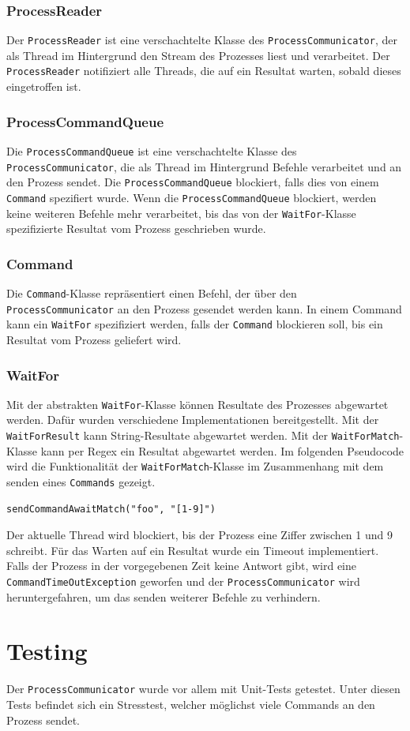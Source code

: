 \subsubsection{ProcessReader}

Der \verb!ProcessReader! ist eine verschachtelte Klasse des \verb!ProcessCommunicator!, der als Thread im Hintergrund den Stream des Prozesses liest und verarbeitet. Der \verb!ProcessReader! notifiziert alle Threads, die auf ein Resultat warten, sobald dieses eingetroffen ist.

\subsubsection{ProcessCommandQueue}

Die \verb!ProcessCommandQueue! ist eine verschachtelte Klasse des \verb!ProcessCommunicator!, die als Thread im Hintergrund Befehle verarbeitet und an den Prozess sendet. Die \verb!ProcessCommandQueue! blockiert, falls dies von einem \verb!Command! spezifiert wurde. Wenn die \verb!ProcessCommandQueue! blockiert, werden keine weiteren Befehle mehr verarbeitet, bis das von der \verb!WaitFor!-Klasse spezifizierte Resultat vom Prozess geschrieben wurde.

\subsubsection{Command}

Die \verb!Command!-Klasse repräsentiert einen Befehl, der über den \verb!ProcessCommunicator! an den Prozess gesendet werden kann. In einem Command kann ein \verb!WaitFor! spezifiziert werden, falls der \verb!Command! blockieren soll, bis ein Resultat vom Prozess geliefert wird.

\newpage
\subsubsection{WaitFor}

Mit der abstrakten \verb!WaitFor!-Klasse können Resultate des Prozesses abgewartet werden. Dafür wurden verschiedene Implementationen bereitgestellt. Mit der \verb!WaitForResult! kann String-Resultate abgewartet werden. Mit der \verb!WaitForMatch!-Klasse kann per Regex ein Resultat abgewartet werden. Im folgenden Pseudocode wird die Funktionalität der \verb!WaitForMatch!-Klasse im Zusammenhang mit dem senden eines \verb!Commands! gezeigt.
%
\begin{verbatim}
sendCommandAwaitMatch("foo", "[1-9]")
\end{verbatim}
%
Der aktuelle Thread wird blockiert, bis der Prozess eine Ziffer zwischen 1 und 9 schreibt. Für das Warten auf ein Resultat wurde ein Timeout implementiert. Falls der Prozess in der vorgegebenen Zeit keine Antwort gibt, wird eine \\ \verb!CommandTimeOutException! geworfen und der \verb!ProcessCommunicator! wird heruntergefahren, um das senden weiterer Befehle zu verhindern.

\section{Testing}
Der \verb!ProcessCommunicator! wurde vor allem mit Unit-Tests getestet. Unter diesen Tests befindet sich ein Stresstest, welcher möglichst viele Commands an den Prozess sendet.

